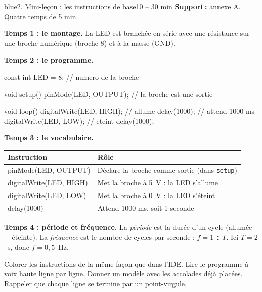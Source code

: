 \documentclass[11pt,a4paper]{article}
\begin{document}
\begin{etape}{blue}{2. Mini-leçon : les instructions de base}{10 -- 30 min}
\textbf{Support\,:} annexe A. Quatre temps de 5 min.

\textbf{Temps 1 : le montage.} La LED est branchée en série avec une résistance sur une broche numérique (broche 8) et à la masse (GND).

\textbf{Temps 2 : le programme.}
\begin{arduino}
const int LED = 8;      // numero de la broche

void setup() {
  pinMode(LED, OUTPUT); // la broche est une sortie
}

void loop() {
  digitalWrite(LED, HIGH); // allume
  delay(1000);             // attend 1000 ms
  digitalWrite(LED, LOW);  // eteint
  delay(1000);
}
\end{arduino}

\textbf{Temps 3 : le vocabulaire.}
\begin{center}
\begin{tabularx}{\linewidth}{>{\ttfamily}p{3.6cm}Y}
\toprule
Instruction & Rôle\\
\midrule
pinMode(LED, OUTPUT) & Déclare la broche comme sortie (dans \texttt{setup})\\
digitalWrite(LED, HIGH) & Met la broche à 5~V : la LED s'allume\\
digitalWrite(LED, LOW) & Met la broche à 0~V : la LED s'éteint\\
delay(1000) & Attend 1000 ms, soit 1 seconde\\
\bottomrule
\end{tabularx}
\end{center}

\textbf{Temps 4 : période et fréquence.} La \emph{période} est la durée d'un cycle (allumée + éteinte). La \emph{fréquence} est le nombre de cycles par seconde : $f = 1 \div T$. Ici $T = 2$~s, donc $f = 0{,}5$~Hz.

\begin{astuce}
Colorer les instructions de la même façon que dans l'IDE. Lire le programme à voix haute ligne par ligne. Donner un modèle avec les accolades déjà placées. Rappeler que chaque ligne se termine par un point-virgule.
\end{astuce}
\end{etape}
\end{document}
